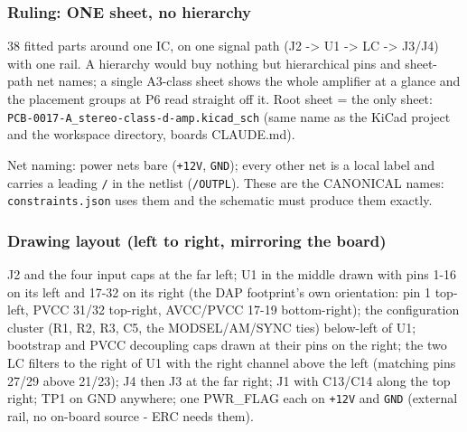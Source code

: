 \documentclass[11pt,a4paper]{article}
\begin{document}
\subsubsection*{Ruling: ONE sheet, no hierarchy}
38 fitted parts around one IC, on one signal path (J2 -\textgreater{} U1 -\textgreater{} LC -\textgreater{} J3/J4) with one rail. A hierarchy would buy nothing but hierarchical pins and sheet-path net names; a single A3-class sheet shows the whole amplifier at a glance and the placement groups at P6 read straight off it. Root sheet = the only sheet: \texttt{PCB-0017-A\_stereo-class-d-amp.kicad\_sch} (same name as the KiCad project and the workspace directory, boards CLAUDE.md).

Net naming: power nets bare (\texttt{+12V}, \texttt{GND}); every other net is a local label and carries a leading \texttt{/} in the netlist (\texttt{/OUTPL}). These are the CANONICAL names: \texttt{constraints.json} uses them and the schematic must produce them exactly.

\subsubsection*{Drawing layout (left to right, mirroring the board)}
J2 and the four input caps at the far left; U1 in the middle drawn with pins 1-16 on its left and 17-32 on its right (the DAP footprint's own orientation: pin 1 top-left, PVCC 31/32 top-right, AVCC/PVCC 17-19 bottom-right); the configuration cluster (R1, R2, R3, C5, the MODSEL/AM/SYNC ties) below-left of U1; bootstrap and PVCC decoupling caps drawn at their pins on the right; the two LC filters to the right of U1 with the right channel above the left (matching pins 27/29 above 21/23); J4 then J3 at the far right; J1 with C13/C14 along the top right; TP1 on GND anywhere; one PWR\_FLAG each on \texttt{+12V} and \texttt{GND} (external rail, no on-board source - ERC needs them).
\end{document}
